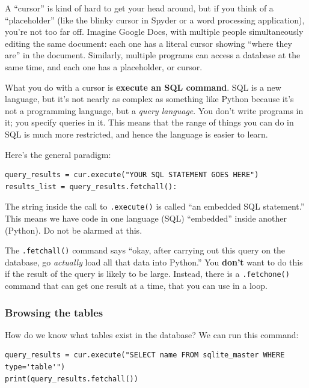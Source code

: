 \documentclass[12pt]{article}
\begin{document}
A ``cursor'' is kind of hard to get your head around, but if you think of a
``placeholder'' (like the blinky cursor in Spyder or a word processing
application), you're not too far off. Imagine Google Docs, with multiple
people simultaneously editing the same document: each one has a literal cursor
showing ``where they are'' in the document. Similarly, multiple programs can
access a database at the same time, and each one has a placeholder, or cursor.

What you do with a cursor is \textbf{execute an SQL command}. SQL is a new
language, but it's not nearly as complex as something like Python because it's
not a programming language, but a \textit{query language}. You don't write
programs in it; you specify queries in it. This means that the range of things
you can do in SQL is much more restricted, and hence the language is easier to
learn.

Here's the general paradigm:
\begin{Verbatim}[fontsize=\small,samepage=true,frame=none]
query_results = cur.execute("YOUR SQL STATEMENT GOES HERE")
results_list = query_results.fetchall():
\end{Verbatim}

The string inside the call to \texttt{.execute()} is called ``an embedded SQL
statement.'' This means we have code in one language (SQL) ``embedded'' inside
another (Python). Do not be alarmed at this.

The \texttt{.fetchall()} command says ``okay, after carrying out this query on
the database, go \textit{actually} load all that data into Python.'' You
\textbf{don't} want to do this if the result of the query is likely to be
large. Instead, there is a \texttt{.fetchone()} command that can get one
result at a time, that you can use in a loop.

\subsubsection{Browsing the tables}

How do we know what tables exist in the database? We can run this command:

\begin{Verbatim}[fontsize=\small,samepage=true,frame=none]
query_results = cur.execute("SELECT name FROM sqlite_master WHERE type='table'")
print(query_results.fetchall())
\end{Verbatim}
\end{document}
